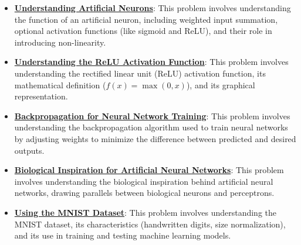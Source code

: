 \documentclass{article}%
\begin{document}
\begin{itemize}[leftmargin=*]
\item \href{https://purdue.brightspace.com/d2l/common/assets/pdfjs-d2l-dist/1.0.14-legacy/web/viewer.html?file=\%2Fcontent\%2Fenforced\%2F1095467-wl.202510.CS.24300.001\%2F09L1-cnn.pdf\%3Fou\%3D1095467\&lang=en-us\&container=d2l-fileviewer-rendered-pdf\&fullscreen=d2l-fileviewer-rendered-pdf-dialog\&height=667#page=5}{\textbf{Understanding Artificial Neurons}}: This problem involves understanding the function of an artificial neuron, including weighted input summation, optional activation functions (like sigmoid and ReLU), and their role in introducing non-linearity.%
\item \href{https://purdue.brightspace.com/d2l/common/assets/pdfjs-d2l-dist/1.0.14-legacy/web/viewer.html?file=\%2Fcontent\%2Fenforced\%2F1095467-wl.202510.CS.24300.001\%2F09L1-cnn.pdf\%3Fou\%3D1095467\&lang=en-us\&container=d2l-fileviewer-rendered-pdf\&fullscreen=d2l-fileviewer-rendered-pdf-dialog\&height=667#page=13}{\textbf{Understanding the ReLU Activation Function}}: This problem involves understanding the rectified linear unit (ReLU) activation function, its mathematical definition ($f(x) = \max(0, x)$), and its graphical representation.%
\item \href{https://purdue.brightspace.com/d2l/common/assets/pdfjs-d2l-dist/1.0.14-legacy/web/viewer.html?file=\%2Fcontent\%2Fenforced\%2F1095467-wl.202510.CS.24300.001\%2F09L1-cnn.pdf\%3Fou\%3D1095467\&lang=en-us\&container=d2l-fileviewer-rendered-pdf\&fullscreen=d2l-fileviewer-rendered-pdf-dialog\&height=667#page=16}{\textbf{Backpropagation for Neural Network Training}}: This problem involves understanding the backpropagation algorithm used to train neural networks by adjusting weights to minimize the difference between predicted and desired outputs.%
\item \href{https://purdue.brightspace.com/d2l/common/assets/pdfjs-d2l-dist/1.0.14-legacy/web/viewer.html?file=\%2Fcontent\%2Fenforced\%2F1095467-wl.202510.CS.24300.001\%2F09L1-cnn.pdf\%3Fou\%3D1095467\&lang=en-us\&container=d2l-fileviewer-rendered-pdf\&fullscreen=d2l-fileviewer-rendered-pdf-dialog\&height=667#page=20}{\textbf{Biological Inspiration for Artificial Neural Networks}}: This problem involves understanding the biological inspiration behind artificial neural networks, drawing parallels between biological neurons and perceptrons.%
\item \href{https://purdue.brightspace.com/d2l/common/assets/pdfjs-d2l-dist/1.0.14-legacy/web/viewer.html?file=\%2Fcontent\%2Fenforced\%2F1095467-wl.202510.CS.24300.001\%2F09L1-cnn.pdf\%3Fou\%3D1095467\&lang=en-us\&container=d2l-fileviewer-rendered-pdf\&fullscreen=d2l-fileviewer-rendered-pdf-dialog\&height=667#page=21}{\textbf{Using the MNIST Dataset}}: This problem involves understanding the MNIST dataset, its characteristics (handwritten digits, size normalization), and its use in training and testing machine learning models.%

\end{itemize}
\end{document}

